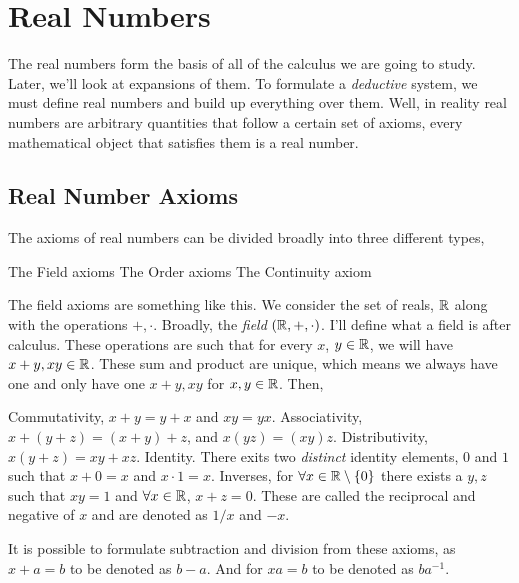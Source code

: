 \chapter{Real Numbers}

The real numbers form the basis of all of the calculus we are going to study. Later, we'll look at expansions of them.
To formulate a \emph{deductive} system, we must define real numbers and build up everything over them. Well, in reality
real numbers are arbitrary quantities that follow a certain set of axioms, every mathematical object that satisfies
them is a real number.

\section{Real Number Axioms}

The axioms of real numbers can be divided broadly into three different types,

\begin{itemize}
    \ii The Field axioms
    \ii The Order axioms
    \ii The Continuity axiom
\end{itemize}

The field axioms are something like this. We consider the set of reals, \(\mathbb R\) along with the operations \(+, \cdot\). Broadly,
the \emph{field} \((\mathbb R, +, \cdot)\). I'll define what a field is after calculus. These operations are such that for every
\(x\), \(y \in \mathbb R\), we will have \(x + y, xy \in \mathbb R\). These sum and product are unique, which means we always have one 
and only have one \(x+y, xy\) for \(x, y \in \mathbb R\). Then,

\begin{itemize}
    \ii Commutativity, \(x+y = y+x\) and \(xy = yx\).
    \ii Associativity, \(x + (y+z) = (x+y) + z\), and \(x(yz) = (xy)z\).
    \ii Distributivity, \(x(y + z) = xy + xz\).
    \ii Identity. There exits two \emph{distinct} identity elements, \(0\) and \(1\) such that \(x + 0 = x\) and \(x \cdot 1 = x\).
    \ii Inverses, for \(\forall x \in \mathbb R \setminus \{0\}\) there exists a \(y, z\) such that \(xy = 1\) and \(\forall x \in \mathbb R\), \(x + z = 0\). These are called the reciprocal 
    and negative of \(x\) and are denoted as \(1/x\) and \(-x\).
\end{itemize}
 
It is possible to formulate subtraction and division from these axioms, as \(x + a = b\) to be denoted as \(b - a\). And for 
\(xa = b\) to be denoted as \(ba^{-1}\). 